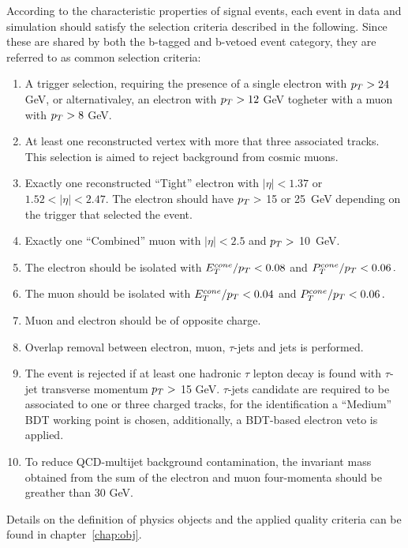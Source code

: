 According to the characteristic properties of signal events, each event in data and simulation should satisfy
the selection criteria described in the following. Since these are shared by both the b-tagged and b-vetoed event category,
they are referred to as common selection criteria:


\begin{enumerate}[label=(\roman*)]
\item A trigger selection, requiring the presence of a single electron with $p_{T} > 24$ GeV, or alternativaley,
	an electron with  $p_{T} > 12$ GeV togheter with a muon with  $p_{T} > 8$ GeV. 

\item At least one reconstructed vertex with more that three associated tracks. This selection is aimed to 
	reject background from cosmic muons.

\item Exactly one reconstructed ``Tight'' electron with $|\eta| < 1.37 $ or $1.52 < |\eta| < 2.47$.
	The electron  should have $p_{T} > $ 15 or 25~GeV depending on the trigger that selected the event. 

\item Exactly one ``Combined'' muon with $|\eta| < 2.5$ and  $p_{T} > $ 10~GeV.

\item The electron should be isolated with $E_T^{cone}/ p_{T} < 0.08$ and $P_T^{cone}/ p_{T} < 0.06\,.$ 

\item The muon should be isolated with  $E_T^{cone}/ p_{T} < 0.04$ and $P_T^{cone}/ p_{T} <  0.06\,.$ 

\item Muon and electron should be of opposite charge.

\item Overlap removal between electron, muon, $\tau$-jets and jets is performed.

\item The event is rejected if at least one hadronic $\tau$ lepton decay is found with  $\tau$-jet transverse 
	momentum  $p_{T} > $ 15 GeV. $\tau$-jets candidate are required to be associated to one or three charged tracks,
	for the identification a ``Medium'' BDT working point is chosen, additionally, a BDT-based electron veto is 
	applied. 

\item To reduce QCD-multijet background contamination, the invariant mass obtained from the sum 
	of the electron and muon four-momenta should be greather than 30 GeV.

\end{enumerate}
Details on  the definition of physics objects and the applied quality criteria  can be found in  chapter~\ref{chap:obj}.


